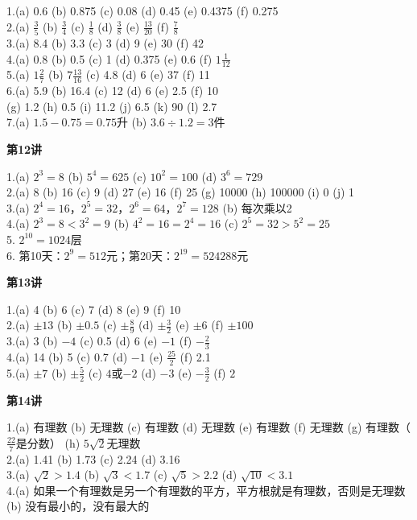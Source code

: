 1.(a) 0.6 \quad (b) 0.875 \quad (c) 0.08 \quad (d) 0.45 \quad (e) 0.4375 \quad (f) 0.275\\
2.(a) $\frac35$ \quad (b) $\frac34$ \quad (c) $\frac18$ \quad (d) $\frac38$ \quad (e) $\frac{13}{20}$ \quad (f) $\frac78$\\
3.(a) 8.4 \quad (b) 3.3 \quad (c) 3 \quad (d) 9 \quad (e) 30 \quad (f) 42\\
4.(a) 0.8 \quad (b) 0.5 \quad (c) 1 \quad (d) 0.375 \quad (e) 0.6 \quad (f) $1\frac{1}{12}$\\
5.(a) $1\frac{2}{7}$ \quad (b) $7\frac{13}{16}$ \quad (c) 4.8 \quad (d) 6 \quad (e) 37 \quad (f) 11\\
6.(a) 5.9 \quad (b) 16.4 \quad (c) 12 \quad (d) 6 \quad (e) 2.5 \quad (f) 10\\
(g) 1.2 \quad (h) 0.5 \quad (i) 11.2 \quad (j) 6.5 \quad (k) 90 \quad (l) 2.7\\
7.(a) $1.5-0.75=0.75$升 \quad (b) $3.6\div1.2=3$件


\textbf{第12讲}

1.(a) $2^3=8$ \quad (b) $5^4=625$ \quad (c) $10^2=100$ \quad (d) $3^6=729$\\
2.(a) 8 \quad (b) 16 \quad (c) 9 \quad (d) 27 \quad (e) 16 \quad (f) 25 \quad (g) 10000 \quad (h) 100000 \quad (i) 0 \quad (j) 1\\
3.(a) $2^4=16$，$2^5=32$，$2^6=64$，$2^7=128$ \quad (b) 每次乘以2\\
4.(a) $2^3=8 < 3^2=9$ \quad (b) $4^2=16 = 2^4=16$ \quad (c) $2^5=32 > 5^2=25$\\
5. $2^{10}=1024$层\\
6. 第10天：$2^9=512$元；第20天：$2^{19}=524288$元

\textbf{第13讲}

1.(a) 4 \quad (b) 6 \quad (c) 7 \quad (d) 8 \quad (e) 9 \quad (f) 10\\
2.(a) $\pm13$ \quad (b) $\pm0.5$ \quad (c) $\pm\frac89$ \quad (d) $\pm\frac32$ \quad (e) $\pm6$ \quad (f) $\pm100$\\
3.(a) 3 \quad (b) $-4$ \quad (c) 0.5 \quad (d) 6 \quad (e) $-1$ \quad (f) $-\frac23$\\
4.(a) 14 \quad (b) 5 \quad (c) 0.7 \quad (d) $-1$ \quad (e) $\frac{25}{2}$ \quad (f) 2.1\\
5.(a) $\pm7$ \quad (b) $\pm\frac52$ \quad (c) $4$或$-2$ \quad (d) $-3$ \quad (e) $-\frac32$ \quad (f) $2$

\textbf{第14讲}

1.(a) 有理数 \quad (b) 无理数 \quad (c) 有理数 \quad (d) 无理数 \quad (e) 有理数 \quad (f) 无理数 \quad (g) 有理数（$\frac{22}{7}$是分数） \quad (h) $5\sqrt2$无理数\\
2.(a) 1.41 \quad (b) 1.73 \quad (c) 2.24 \quad (d) 3.16\\
3.(a) $\sqrt2>1.4$ \quad (b) $\sqrt3<1.7$ \quad (c) $\sqrt5>2.2$ \quad (d) $\sqrt{10}<3.1$\\
4.(a) 如果一个有理数是另一个有理数的平方，平方根就是有理数，否则是无理数 \quad (b) 没有最小的，没有最大的

